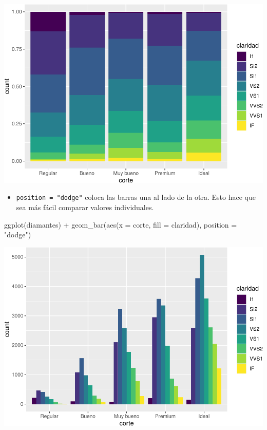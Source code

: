\documentclass[
  openany]{book}
\newenvironment{Shaded}{\begin{snugshade}}{\end{snugshade}}
\newcommand{\AttributeTok}[1]{\textcolor[rgb]{0.77,0.63,0.00}{#1}}
\newcommand{\FunctionTok}[1]{\textcolor[rgb]{0.00,0.00,0.00}{#1}}
\newcommand{\NormalTok}[1]{#1}
\newcommand{\SpecialCharTok}[1]{\textcolor[rgb]{0.00,0.00,0.00}{#1}}
\newcommand{\StringTok}[1]{\textcolor[rgb]{0.31,0.60,0.02}{#1}}
\providecommand{\tightlist}{%
  \setlength{\itemsep}{0pt}\setlength{\parskip}{0pt}}
\begin{document}
\begin{center}\includegraphics[width=1\linewidth]{DT6_files/figure-latex/unnamed-chunk-65-1} \end{center}

\begin{itemize}
\tightlist
\item
  \texttt{position\ =\ "dodge"} coloca las barras una al lado de la otra. Esto hace que sea más fácil comparar valores individuales.
\end{itemize}

\begin{Shaded}
\begin{Highlighting}[]
\FunctionTok{ggplot}\NormalTok{(diamantes) }\SpecialCharTok{+}
  \FunctionTok{geom\_bar}\NormalTok{(}\FunctionTok{aes}\NormalTok{(}\AttributeTok{x =}\NormalTok{ corte, }\AttributeTok{fill =}\NormalTok{ claridad), }\AttributeTok{position =} \StringTok{"dodge"}\NormalTok{)}
\end{Highlighting}
\end{Shaded}

\begin{center}\includegraphics[width=1\linewidth]{DT6_files/figure-latex/unnamed-chunk-66-1} \end{center}
\end{document}
